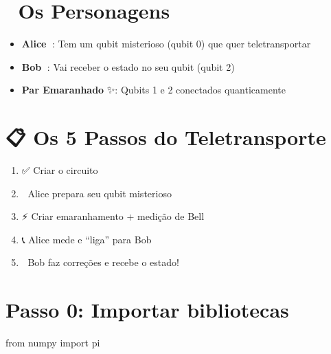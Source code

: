 \documentclass[
  brazilian,
]{report}
\newenvironment{Shaded}{\begin{snugshade}}{\end{snugshade}}
\newcommand{\NormalTok}[1]{\textcolor[rgb]{0.00,0.23,0.31}{#1}}
\providecommand{\tightlist}{%
  \setlength{\itemsep}{0pt}\setlength{\parskip}{0pt}}
\begin{document}
\section{👥 Os Personagens}\label{os-personagens}

\begin{itemize}
\tightlist
\item
  \textbf{Alice} 👩: Tem um qubit misterioso (qubit 0) que quer
  teletransportar
\item
  \textbf{Bob} 🧑: Vai receber o estado no seu qubit (qubit 2)
\item
  \textbf{Par Emaranhado} ✨: Qubits 1 e 2 conectados quanticamente
\end{itemize}

\section{📋 Os 5 Passos do
Teletransporte}\label{os-5-passos-do-teletransporte}

\begin{enumerate}
\def\labelenumi{\arabic{enumi}.}
\tightlist
\item
  ✅ Criar o circuito
\item
  🎯 Alice prepara seu qubit misterioso\\
\item
  ⚡ Criar emaranhamento + medição de Bell
\item
  📞 Alice mede e ``liga'' para Bob
\item
  🔧 Bob faz correções e recebe o estado!
\end{enumerate}

\section{Passo 0: Importar
bibliotecas}\label{passo-0-importar-bibliotecas}

\begin{Shaded}
\begin{Highlighting}[]
\NormalTok{from numpy import pi}
\end{Highlighting}
\end{Shaded}
\end{document}
